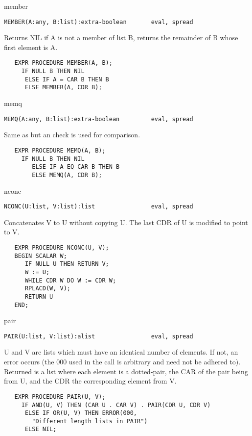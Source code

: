 \begin{Function}{member}
\begin{verbatim}
MEMBER(A:any, B:list):extra-boolean       eval, spread
\end{verbatim}
   Returns  NIL  if A  is not  a member  of  list B,  returns the
   remainder of B whose first element is A.
\begin{verbatim}
   EXPR PROCEDURE MEMBER(A, B);
     IF NULL B THEN NIL
      ELSE IF A = CAR B THEN B
      ELSE MEMBER(A, CDR B);
\end{verbatim}

\end{Function}
\begin{Function}{memq}
\begin{verbatim}
MEMQ(A:any, B:list):extra-boolean         eval, spread
\end{verbatim}
   Same as  but an  check is used for comparison.
\begin{verbatim}
   EXPR PROCEDURE MEMQ(A, B);
     IF NULL B THEN NIL
        ELSE IF A EQ CAR B THEN B
        ELSE MEMQ(A, CDR B);
\end{verbatim}

\end{Function}
\begin{Function}{nconc}
\begin{verbatim}
NCONC(U:list, V:list):list                eval, spread
\end{verbatim}
   Concatenates  V to U without  copying U. The last  CDR of U is
   modified to point to V.
\begin{verbatim}
   EXPR PROCEDURE NCONC(U, V);
   BEGIN SCALAR W;
      IF NULL U THEN RETURN V;
      W := U;
      WHILE CDR W DO W := CDR W;
      RPLACD(W, V);
      RETURN U
   END;
\end{verbatim}
\end{Function}
\begin{Function}{pair}
\begin{verbatim}
PAIR(U:list, V:list):alist                eval, spread
\end{verbatim}
   U  and  V are  lists which  must have  an identical  number of
   elements.   If not, an error occurs (the 000 used in the 
   call  is arbitrary and need not be adhered to).  Returned is a
   list  where each element is a dotted-pair, the CAR of the pair
   being from U, and the CDR the corresponding element from V.
\begin{verbatim}
   EXPR PROCEDURE PAIR(U, V);
     IF AND(U, V) THEN (CAR U . CAR V) . PAIR(CDR U, CDR V)
      ELSE IF OR(U, V) THEN ERROR(000,
        "Different length lists in PAIR")
      ELSE NIL;
\end{verbatim}
\end{Function}
